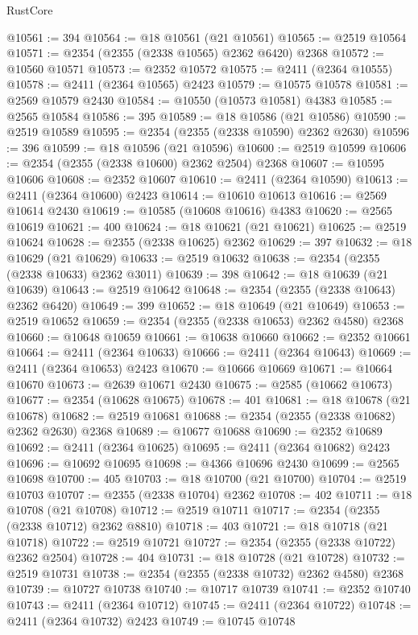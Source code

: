 \begin{lexlean}{RustCore}
\begin{coremodule}
@10561 := 394
@10564 := @18 @10561 (@21 @10561)
@10565 := @2519 @10564
@10571 := @2354 (@2355 (@2338 @10565) @2362 @6420) @2368
@10572 := @10560 @10571
@10573 := @2352 @10572
@10575 := @2411 (@2364 @10555)
@10578 := @2411 (@2364 @10565) @2423
@10579 := @10575 @10578
@10581 := @2569 @10579 @2430
@10584 := @10550 (@10573 @10581) @4383
@10585 := @2565 @10584
@10586 := 395
@10589 := @18 @10586 (@21 @10586)
@10590 := @2519 @10589
@10595 := @2354 (@2355 (@2338 @10590) @2362 @2630)
@10596 := 396
@10599 := @18 @10596 (@21 @10596)
@10600 := @2519 @10599
@10606 := @2354 (@2355 (@2338 @10600) @2362 @2504) @2368
@10607 := @10595 @10606
@10608 := @2352 @10607
@10610 := @2411 (@2364 @10590)
@10613 := @2411 (@2364 @10600) @2423
@10614 := @10610 @10613
@10616 := @2569 @10614 @2430
@10619 := @10585 (@10608 @10616) @4383
@10620 := @2565 @10619
@10621 := 400
@10624 := @18 @10621 (@21 @10621)
@10625 := @2519 @10624
@10628 := @2355 (@2338 @10625) @2362
@10629 := 397
@10632 := @18 @10629 (@21 @10629)
@10633 := @2519 @10632
@10638 := @2354 (@2355 (@2338 @10633) @2362 @3011)
@10639 := 398
@10642 := @18 @10639 (@21 @10639)
@10643 := @2519 @10642
@10648 := @2354 (@2355 (@2338 @10643) @2362 @6420)
@10649 := 399
@10652 := @18 @10649 (@21 @10649)
@10653 := @2519 @10652
@10659 := @2354 (@2355 (@2338 @10653) @2362 @4580) @2368
@10660 := @10648 @10659
@10661 := @10638 @10660
@10662 := @2352 @10661
@10664 := @2411 (@2364 @10633)
@10666 := @2411 (@2364 @10643)
@10669 := @2411 (@2364 @10653) @2423
@10670 := @10666 @10669
@10671 := @10664 @10670
@10673 := @2639 @10671 @2430
@10675 := @2585 (@10662 @10673)
@10677 := @2354 (@10628 @10675)
@10678 := 401
@10681 := @18 @10678 (@21 @10678)
@10682 := @2519 @10681
@10688 := @2354 (@2355 (@2338 @10682) @2362 @2630) @2368
@10689 := @10677 @10688
@10690 := @2352 @10689
@10692 := @2411 (@2364 @10625)
@10695 := @2411 (@2364 @10682) @2423
@10696 := @10692 @10695
@10698 := @4366 @10696 @2430
@10699 := @2565 @10698
@10700 := 405
@10703 := @18 @10700 (@21 @10700)
@10704 := @2519 @10703
@10707 := @2355 (@2338 @10704) @2362
@10708 := 402
@10711 := @18 @10708 (@21 @10708)
@10712 := @2519 @10711
@10717 := @2354 (@2355 (@2338 @10712) @2362 @8810)
@10718 := 403
@10721 := @18 @10718 (@21 @10718)
@10722 := @2519 @10721
@10727 := @2354 (@2355 (@2338 @10722) @2362 @2504)
@10728 := 404
@10731 := @18 @10728 (@21 @10728)
@10732 := @2519 @10731
@10738 := @2354 (@2355 (@2338 @10732) @2362 @4580) @2368
@10739 := @10727 @10738
@10740 := @10717 @10739
@10741 := @2352 @10740
@10743 := @2411 (@2364 @10712)
@10745 := @2411 (@2364 @10722)
@10748 := @2411 (@2364 @10732) @2423
@10749 := @10745 @10748

\end{coremodule}
\end{lexlean}
